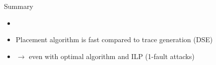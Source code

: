 \begin{frame}{Summary}
\begin{small}
        \begin{itemize}
            \item[]
            \item Placement algorithm is fast compared to trace generation (DSE)
            \item[] $\rightarrow$ even with optimal algorithm and ILP (1-fault attacks)
        \end{itemize}
    \end{small}
\vfill
\end{frame}
